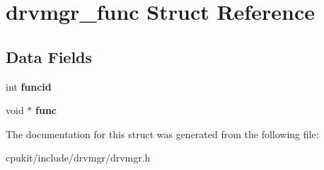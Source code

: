 \hypertarget{structdrvmgr__func}{}\section{drvmgr\+\_\+func Struct Reference}
\label{structdrvmgr__func}
\subsection*{Data Fields}
\begin{DoxyCompactItemize}
\item 
\mbox{\label{structdrvmgr__func_af638d768688e1ad218e75fae1e904a40}} 
int {\bfseries funcid}
\item 
\mbox{\label{structdrvmgr__func_a04e37917635602e029058b86daa77484}} 
void $\ast$ {\bfseries func}
\end{DoxyCompactItemize}


The documentation for this struct was generated from the following file\+:\begin{DoxyCompactItemize}
\item 
cpukit/include/drvmgr/drvmgr.\+h\end{DoxyCompactItemize}
